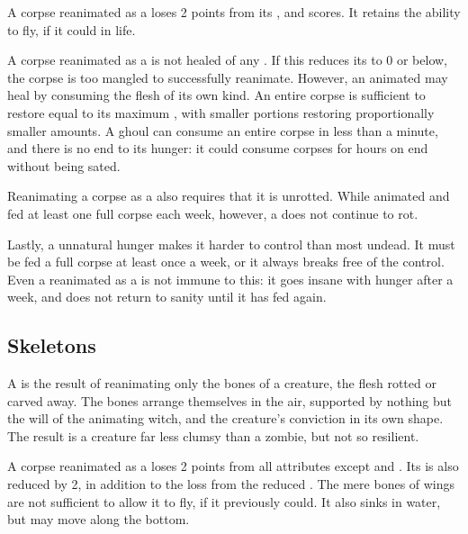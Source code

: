 A corpse reanimated as a  loses 2 points from its ,  and  scores.
It retains the ability to fly, if it could in life.

A corpse reanimated as a  is not healed of any {\damage}.
If this reduces its  to 0 or below, the corpse is too mangled to successfully reanimate.
However, an animated  may heal {\damage} by consuming the flesh of its own kind.
An entire corpse is sufficient to restore {\damage} equal to its maximum , with smaller portions restoring proportionally smaller amounts.
A ghoul can consume an entire corpse in less than a minute, and there is no end to its hunger: it could consume corpses for hours on end without being sated.

Reanimating a corpse as a  also requires that it is unrotted.
While animated and fed at least one full corpse each week, however, a  does not continue to rot.

Lastly, a  unnatural hunger makes it harder to control than most undead.
It must be fed a full corpse at least once a week, or it always breaks free of the  control.
Even a  reanimated as a  is not immune to this: it goes insane with hunger after a week, and does not return to sanity until it has fed again.

\subsection{Skeletons}

A  is the result of reanimating only the bones of a creature, the flesh rotted or carved away.
The bones arrange themselves in the air, supported by nothing but the will of the animating witch, and the creature's conviction in its own shape.
The result is a creature far less clumsy than a zombie, but not so resilient.

A corpse reanimated as a  loses 2 points from all attributes except  and .
Its  is also reduced by 2, in addition to the loss from the reduced .
The mere bones of wings are not sufficient to allow it to fly, if it previously could.
It also sinks in water, but may move along the bottom.

